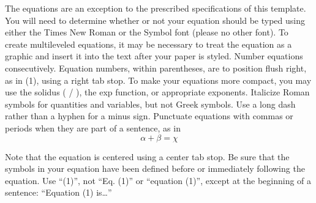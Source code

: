 \documentclass[letterpaper, 10 pt, conference]{ieeeconf}  %
\begin{document}
The equations are an exception to the prescribed specifications of this template. You will need to determine whether or not your equation should be typed using either the Times New Roman or the Symbol font (please no other font). To create multileveled equations, it may be necessary to treat the equation as a graphic and insert it into the text after your paper is styled. Number equations consecutively. Equation numbers, within parentheses, are to position flush right, as in (1), using a right tab stop. To make your equations more compact, you may use the solidus ( / ), the exp function, or appropriate exponents. Italicize Roman symbols for quantities and variables, but not Greek symbols. Use a long dash rather than a hyphen for a minus sign. Punctuate equations with commas or periods when they are part of a sentence, as in
\begin{equation}
  \alpha + \beta = \chi
\end{equation}

Note that the equation is centered using a center tab stop. Be sure that the symbols in your equation have been defined before or immediately following the equation. Use ``(1)'', not ``Eq. (1)'' or ``equation (1)'', except at the beginning of a sentence: ``Equation (1) is\ldots''
\end{document}

